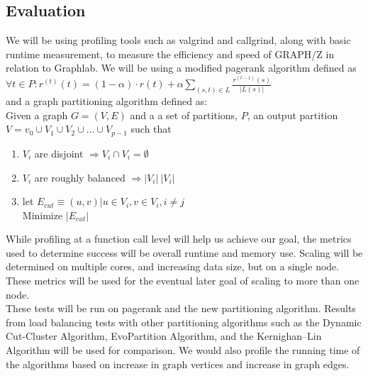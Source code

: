 \documentclass[10pt]{article}
\begin{document}
\begin{multicols}{2}
  \section{Evaluation}
  We will be using profiling tools such as valgrind and callgrind, along with basic runtime measurement, to measure the efficiency and speed of GRAPH/Z in relation to Graphlab. We will be using a modified pagerank algorithm defined as \\
  $\forall t \in P : r^{(t)}(t)  = (1-\alpha) \cdot r(t) + \alpha \sum_{(s,t) \in L} \frac{r^{(t-1)}(s)}{|L(s)|}$\\ 
  and a graph partitioning algorithm defined as:\\
  Given a graph $G = (V,E)$ and a a set of partitions, $P$, an output partition $V = v_0 \cup V_1 \cup V_2 \cup \ldots \cup V_{p-1}$ such that
  \begin{enumerate}
  \item ${V_i}$ are disjoint $\Rightarrow V_i \cap V_i = \emptyset$
  \item ${V_i}$ are roughly balanced $\Rightarrow |V_i| ~ |V_i|$
  \item let $E_{cut} \equiv {(u,v) | u \in V_i, v \in V_i, i \neq j}$\\
    Minimize $|E_{cut}|$
  \end{enumerate}
  While profiling at a function call level will help us achieve our goal, the metrics used to determine success will be overall runtime and memory use. Scaling will be determined on multiple cores, and increasing data size, but on a single node.  These metrics will be used for the eventual later goal of scaling to more than one node.\\
  These tests will be run on pagerank and the new partitioning algorithm. Results from load balancing tests with other partitioning algorithms such as the Dynamic Cut-Cluster Algorithm, EvoPartition Algorithm, and the Kernighan–Lin Algorithm will be used for comparison. We would also profile the running time of the algorithms based on increase in graph vertices and increase in graph edges.
\end{multicols}
\end{document}
